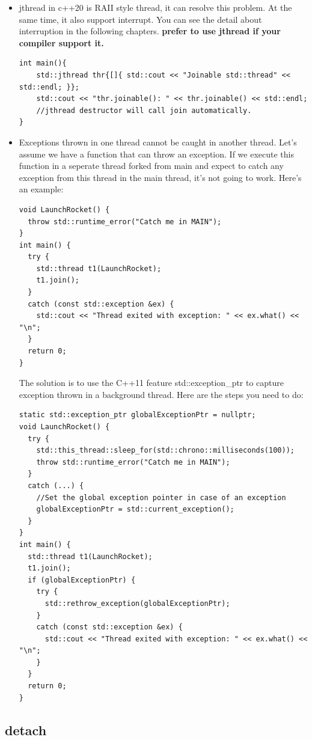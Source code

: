 \documentclass[a4paper,11pt,twoside]{book}
\begin{document}
\begin{itemize}
\item jthread in c++20 is RAII style thread, it can resolve this problem. At the same time, it also support interrupt. You can see the detail about interruption in the following chapters.  \textbf{prefer to use jthread if your compiler support it.} 
\begin{lstlisting}
int main(){
    std::jthread thr{[]{ std::cout << "Joinable std::thread" << std::endl; }};
    std::cout << "thr.joinable(): " << thr.joinable() << std::endl;
	//jthread destructor will call join automatically.
}
\end{lstlisting}
\item Exceptions thrown in one thread cannot be caught in another thread. Let's assume we have a function that can throw an exception. If we execute this function in a seperate thread forked from main and expect to catch any exception from this thread in the main thread, it's not going to work. Here's an example:
\begin{lstlisting}[]
void LaunchRocket() {
  throw std::runtime_error("Catch me in MAIN");
}
int main() {
  try {
    std::thread t1(LaunchRocket);
    t1.join();
  }
  catch (const std::exception &ex) {
    std::cout << "Thread exited with exception: " << ex.what() << "\n";
  }
  return 0;
}
\end{lstlisting}

The solution is to use the C++11 feature std::exception\_ptr to capture exception thrown in a background thread. Here are the steps you need to do:
\begin{lstlisting}[]
static std::exception_ptr globalExceptionPtr = nullptr;
void LaunchRocket() {
  try {
    std::this_thread::sleep_for(std::chrono::milliseconds(100));
    throw std::runtime_error("Catch me in MAIN");
  }
  catch (...) {
    //Set the global exception pointer in case of an exception
    globalExceptionPtr = std::current_exception();
  }
}
int main() {
  std::thread t1(LaunchRocket);
  t1.join();
  if (globalExceptionPtr) {
    try {
      std::rethrow_exception(globalExceptionPtr);
    }
    catch (const std::exception &ex) {
      std::cout << "Thread exited with exception: " << ex.what() << "\n";
    }
  }
  return 0;
}
\end{lstlisting}

\end{itemize}

\subsection{detach}
\end{document}
